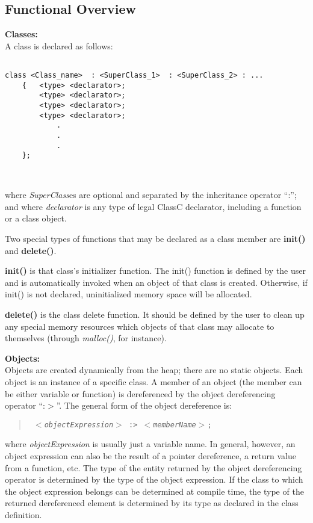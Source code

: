 \subsection{Functional Overview}

{\bf Classes:}\\
A class is declared as follows:
\begin{verbatim}

class <Class_name>  : <SuperClass_1>  : <SuperClass_2> : ...
	{	<type> <declarator>;
	 	<type> <declarator>;
	 	<type> <declarator>;
	 	<type> <declarator>;
			.
			.
			.
	};



\end{verbatim}
where {\em SuperClass}es
are optional and separated by the inheritance operator ``:''; and where
{\em declarator}
is any type of legal ClassC declarator, including a function
or a class object.

Two special types of
functions that may be declared as a class member are
{\bf init()} and {\bf delete()}.

{\bf init()}
is that class's initializer function.  The init() function is defined by
the user and is automatically invoked when an
object of that class is created.  Otherwise, if init() is not declared,
uninitialized memory space will be allocated.

{\bf delete()}
is the class delete function.  It should be defined by the user to clean up
any special memory resources which objects of that class may allocate to
themselves (through {\em malloc()},
for instance).

{\flushleft \bf Objects:}\\
Objects are created dynamically from the heap; there are no static objects.
Each object is an instance of a specific class.
A member of an object (the member can be either variable or function)
is dereferenced by the object dereferencing operator ``:$>$''.  The general
form of the object dereference is:
\begin{quote} \tt
{\em $<$objectExpression$>$} :> {\em $<$memberName$>$};
\end{quote}
where {\em objectExpression} is usually just a variable name.  In general,
however, an object expression can also be the result of a pointer
dereference, a return value from a function, etc.
The type of the entity returned by the object dereferencing operator is
determined by the type of the object expression.  If the class to which
the object
expression belongs can be determined at compile time, the
type of the returned dereferenced element is determined by its type as
declared in the class definition.

